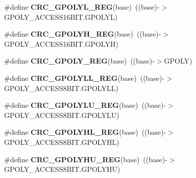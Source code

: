 \begin{DoxyCompactItemize}
\item 
\#define {\bfseries C\+R\+C\+\_\+\+G\+P\+O\+L\+Y\+L\+\_\+\+R\+EG}(base)~((base)-\/$>$G\+P\+O\+L\+Y\+\_\+\+A\+C\+C\+E\+S\+S16\+B\+I\+T.\+G\+P\+O\+L\+YL)\hypertarget{group__CRC__Register__Accessor__Macros_ga28de0343fb8a1934ead620d158bfa09d}{}\label{group__CRC__Register__Accessor__Macros_ga28de0343fb8a1934ead620d158bfa09d}

\item 
\#define {\bfseries C\+R\+C\+\_\+\+G\+P\+O\+L\+Y\+H\+\_\+\+R\+EG}(base)~((base)-\/$>$G\+P\+O\+L\+Y\+\_\+\+A\+C\+C\+E\+S\+S16\+B\+I\+T.\+G\+P\+O\+L\+YH)\hypertarget{group__CRC__Register__Accessor__Macros_gab28b160dd6192ee846e9399e4c9dea1b}{}\label{group__CRC__Register__Accessor__Macros_gab28b160dd6192ee846e9399e4c9dea1b}

\item 
\#define {\bfseries C\+R\+C\+\_\+\+G\+P\+O\+L\+Y\+\_\+\+R\+EG}(base)~((base)-\/$>$G\+P\+O\+LY)\hypertarget{group__CRC__Register__Accessor__Macros_gab762c4d55706670f1175d3f659e00c44}{}\label{group__CRC__Register__Accessor__Macros_gab762c4d55706670f1175d3f659e00c44}

\item 
\#define {\bfseries C\+R\+C\+\_\+\+G\+P\+O\+L\+Y\+L\+L\+\_\+\+R\+EG}(base)~((base)-\/$>$G\+P\+O\+L\+Y\+\_\+\+A\+C\+C\+E\+S\+S8\+B\+I\+T.\+G\+P\+O\+L\+Y\+LL)\hypertarget{group__CRC__Register__Accessor__Macros_gaaeeed4029e6a0189e90c623c2aa0879b}{}\label{group__CRC__Register__Accessor__Macros_gaaeeed4029e6a0189e90c623c2aa0879b}

\item 
\#define {\bfseries C\+R\+C\+\_\+\+G\+P\+O\+L\+Y\+L\+U\+\_\+\+R\+EG}(base)~((base)-\/$>$G\+P\+O\+L\+Y\+\_\+\+A\+C\+C\+E\+S\+S8\+B\+I\+T.\+G\+P\+O\+L\+Y\+LU)\hypertarget{group__CRC__Register__Accessor__Macros_ga6891ecb9421719bedd3b17a3f3c498c3}{}\label{group__CRC__Register__Accessor__Macros_ga6891ecb9421719bedd3b17a3f3c498c3}

\item 
\#define {\bfseries C\+R\+C\+\_\+\+G\+P\+O\+L\+Y\+H\+L\+\_\+\+R\+EG}(base)~((base)-\/$>$G\+P\+O\+L\+Y\+\_\+\+A\+C\+C\+E\+S\+S8\+B\+I\+T.\+G\+P\+O\+L\+Y\+HL)\hypertarget{group__CRC__Register__Accessor__Macros_ga78ffeec89894a1a292c17e03c05b68f5}{}\label{group__CRC__Register__Accessor__Macros_ga78ffeec89894a1a292c17e03c05b68f5}

\item 
\#define {\bfseries C\+R\+C\+\_\+\+G\+P\+O\+L\+Y\+H\+U\+\_\+\+R\+EG}(base)~((base)-\/$>$G\+P\+O\+L\+Y\+\_\+\+A\+C\+C\+E\+S\+S8\+B\+I\+T.\+G\+P\+O\+L\+Y\+HU)\hypertarget{group__CRC__Register__Accessor__Macros_ga752e36d47529b18e3e973212952e92af}{}\label{group__CRC__Register__Accessor__Macros_ga752e36d47529b18e3e973212952e92af}


\end{DoxyCompactItemize}
